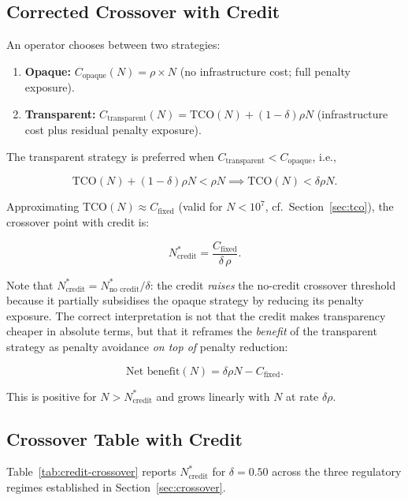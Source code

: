 \subsection{Corrected Crossover with Credit}
\label{subsec:credit-crossover}

An operator chooses between two strategies:

\begin{enumerate}
  \item \textbf{Opaque:}
  $C_{\text{opaque}}(N) = \rho \times N$
  (no infrastructure cost; full penalty exposure).

  \item \textbf{Transparent:}
  $C_{\text{transparent}}(N) = \text{TCO}(N) + (1-\delta)\rho N$
  (infrastructure cost plus residual penalty exposure).
\end{enumerate}

The transparent strategy is preferred when
$C_{\text{transparent}} < C_{\text{opaque}}$, i.e.,

\[
  \text{TCO}(N) + (1-\delta)\rho N < \rho N
  \implies \text{TCO}(N) < \delta \rho N.
\]

Approximating $\text{TCO}(N) \approx C_{\text{fixed}}$ (valid for
$N < 10^7$, cf.\ Section~\ref{sec:tco}), the crossover point with
credit is:

\[
  \boxed{N^*_{\text{credit}} = \frac{C_{\text{fixed}}}{\delta \, \rho}.}
\]

Note that $N^*_{\text{credit}} = N^*_{\text{no credit}} / \delta$:
the credit \emph{raises} the no-credit crossover threshold because it
partially subsidises the opaque strategy by reducing its penalty
exposure. The correct interpretation is not that the credit makes
transparency cheaper in absolute terms, but that it reframes the
\emph{benefit} of the transparent strategy as penalty avoidance
\emph{on top of} penalty reduction:

\[
  \text{Net benefit}(N) = \delta \rho N - C_{\text{fixed}}.
\]

This is positive for $N > N^*_{\text{credit}}$ and grows linearly
with $N$ at rate $\delta \rho$.

\subsection{Crossover Table with Credit}
\label{subsec:credit-table}

Table~\ref{tab:credit-crossover} reports $N^*_{\text{credit}}$ for
$\delta = 0.50$ across the three regulatory regimes established in
Section~\ref{sec:crossover}.

